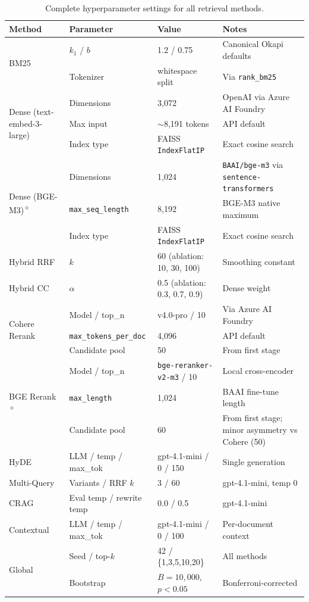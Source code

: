 \documentclass{article}
\begin{document}
\begin{table}[!t]
\centering
\scriptsize
\setlength{\tabcolsep}{4pt}
\begin{tabular}{@{}llll@{}}
\toprule
\textbf{Method} & \textbf{Parameter} & \textbf{Value} & \textbf{Notes} \\
\midrule
\multirow{2}{*}{BM25}
  & $k_1$ / $b$      & 1.2 / 0.75 & Canonical Okapi defaults \\
  & Tokenizer        & whitespace split & Via \texttt{rank\_bm25} \\
\midrule
\multirow{3}{*}{Dense (text-embed-3-large)}
  & Dimensions       & 3{,}072 & OpenAI via Azure AI Foundry \\
  & Max input        & $\sim$8{,}191 tokens & API default \\
  & Index type       & FAISS \texttt{IndexFlatIP} & Exact cosine search \\
\midrule
\multirow{3}{*}{Dense (BGE-M3)\textsuperscript{$\diamond$}}
  & Dimensions       & 1{,}024 & \texttt{BAAI/bge-m3} via \texttt{sentence-transformers} \\
  & \texttt{max\_seq\_length} & 8{,}192 & BGE-M3 native maximum \\
  & Index type       & FAISS \texttt{IndexFlatIP} & Exact cosine search \\
\midrule
Hybrid RRF & $k$ & 60 (ablation: 10, 30, 100) & Smoothing constant \\
\midrule
Hybrid CC & $\alpha$ & 0.5 (ablation: 0.3, 0.7, 0.9) & Dense weight \\
\midrule
\multirow{3}{*}{Cohere Rerank}
  & Model / top\_n   & v4.0-pro / 10 & Via Azure AI Foundry \\
  & \texttt{max\_tokens\_per\_doc} & 4{,}096 & API default \\
  & Candidate pool   & 50    & From first stage \\
\midrule
\multirow{3}{*}{BGE Rerank\textsuperscript{$\diamond$}}
  & Model / top\_n   & \texttt{bge-reranker-v2-m3} / 10 & Local cross-encoder \\
  & \texttt{max\_length} & 1{,}024 & BAAI fine-tune length \\
  & Candidate pool   & 60 & From first stage; minor asymmetry vs Cohere (50) \\
\midrule
HyDE & LLM / temp / max\_tok & gpt-4.1-mini / 0 / 150 & Single generation \\
\midrule
Multi-Query & Variants / RRF $k$ & 3 / 60 & gpt-4.1-mini, temp 0 \\
\midrule
CRAG & Eval temp / rewrite temp & 0.0 / 0.5 & gpt-4.1-mini \\
\midrule
Contextual & LLM / temp / max\_tok & gpt-4.1-mini / 0 / 100 & Per-document context \\
\midrule
\multirow{2}{*}{Global}
  & Seed / top-$k$ & 42 / \{1,3,5,10,20\} & All methods \\
  & Bootstrap & $B{=}10{,}000$, $p{<}0.05$ & Bonferroni-corrected \\
\bottomrule
\end{tabular}
\vspace{4pt}
\caption{Complete hyperparameter settings for all retrieval methods.}
\label{tab:hyperparams}
\end{table}
\end{document}
